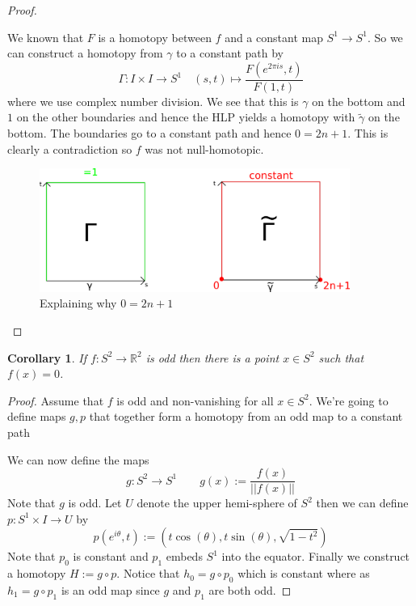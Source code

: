 \documentclass[11pt]{article}
\newcommand{\defeq}{:=}
\newcommand{\norm}[1]{||#1||}
\newcommand{\R}{\mathbb{R}}
\newtheorem{cor}[theorem]{Corollary}
\begin{document}
\begin{proof}
\begin{enumerate}
		We known that $F$ is a homotopy between $f$ and a constant map $S^1\to S^1$.
		So we can construct a homotopy from $\gamma$ to a constant path by
		\[
			\Gamma:I \times I \to S^1 \quad (s, t)\mapsto \frac{F(e^{2\pi i s}, t)}{F(1, t)}
		\]
		where we use complex number division.
		We see that this is $\gamma$ on the bottom and $1$ on the other boundaries and hence the HLP yields a homotopy with $\widetilde{\gamma}$ on the bottom.
		The boundaries go to a constant path and hence $0=2n+1$.
		This is clearly a contradiction so $f$ was not null-homotopic.
		\begin{figure}[ht]
			\centering
			\includegraphics[width=4in]{odd-null.png}
			\caption{Explaining why $0=2n+1$}
		\end{figure}
		
\end{enumerate}

\end{proof}

\begin{cor}
	If $f:S^2 \to \R^2$ is odd then there is a point $x\in S^2$ such that $f(x)=0$.
\end{cor}

\begin{proof}
Assume that $f$ is odd and non-vanishing for all $x\in S^2$.
We're going to define maps $g,p$ that together form a homotopy from an odd map to a constant path
\begin{figure}[H]
	\centering
\end{figure}
We can now define the maps
\[
	g:S^2\to S^1 \quad \quad g(x)\defeq\frac{f(x)}{\norm{f(x)}}
\]
Note that $g$ is odd.
Let $U$ denote the upper hemi-sphere of $S^2$ then we can define $p:S^1\times I \to U$ by
\[
	p(e^{i\theta}, t) \defeq (t\cos(\theta), t\sin(\theta), \sqrt{1-t^2})
\]
Note that $p_0$ is constant and $p_1$ embeds $S^1$ into the equator.
Finally we construct a homotopy $H\defeq g \circ p$.
Notice that $h_0=g\circ p_0$ which is constant where as $h_1=g\circ p_1$ is an odd map since $g$ and $p_1$ are both odd.
\end{proof}
\end{document}
